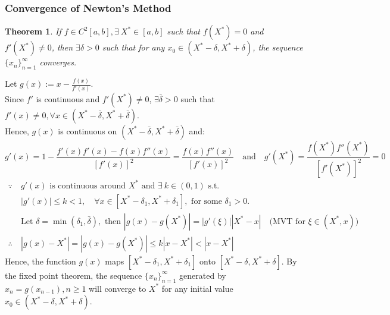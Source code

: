\documentclass[12pt, a4paper]{article}
\makeatletter
\theoremstyle{break}
\newtheorem{theorem}{Theorem}[section]
\renewenvironment{proof}[1][\proofname]{\par
  \pushQED{\qed}%
  \normalfont \topsep6\p@\@plus6\p@\relax
  \trivlist
  \item[\hskip\labelsep\bfseries #1\@addpunct{.}]\mbox{}\newline\ignorespaces
}{%
  \popQED\endtrivlist\@endpefalse
}
\makeatother
\begin{document}
\subsubsection{Convergence of Newton's Method}
\begin{theorem}
If $f \in C^2[a ,b], \exists \ X^* \in [a ,b]$ such that $f(X^*) = 0$ and $f'(X^*) \neq 0$, then $\exists \delta > 0$ such that for any $x_0 \in (X^* - \delta , X^* + \delta)$, the sequence $\{x_n\}_{n=1}^{\infty}$ converges.
\end{theorem}

\begin{proof}
Let $g(x) := x - \frac{f(x)}{f'(x)}$. \\
Since $f'$ is continuous and $f'(X^*) \neq 0$, $\exists \bar{\delta} > 0$ such that $f'(x) \neq 0, \forall x \in (X^* - \bar{\delta}, X^* + \bar{\delta})$.
\\
Hence, $g(x)$ is continuous on $(X^* - \bar{\delta} ,X^* + \bar{\delta})$ and:
\[ g'(x) = 1 - \frac{f'(x)f'(x) - f(x)f''(x)}{[f'(x)]^2} = \frac{f(x)f''(x)}{[f'(x)]^2} \quad \text{and} \quad g'(X^*) = \frac{f(X^*)f''(X^*)}{[f'(X^*)]^2} = 0 \]
\begin{align*}
\because \ &g'(x) \text{ is continuous around } X^* \text{ and } \exists \ k \in (0, 1) \text{ s.t. } \\
&|g'(x)| \le k < 1, \quad \forall x \in [X^* - \delta_1, X^* + \delta_1], \text{ for some } \delta_1 > 0. \\
&\text{Let } \delta = \min(\delta_1, \bar{\delta}), \text{ then } |g(x) - g(X^*)| = |g'(\xi)||X^* - x| \quad \text{(MVT for $\xi \in (X^*, x)$)} \\
\therefore \ &|g(x) - X^*| = |g(x) - g(X^*)| \le k|x-X^*| < |x-X^*|
\end{align*}
Hence, the function $g(x)$ maps $[X^* - \delta_1, X^* + \delta_1]$ onto $[X^* - \delta, X^* + \delta]$.
By the fixed point theorem, the sequence $\{x_n\}_{n = 1}^{\infty}$ generated by $x_n = g(x_{n-1}), n \ge 1$ will converge to $X^*$ for any initial value $x_0 \in (X^* - \delta, X^* + \delta)$.
\end{proof}
\end{document}
